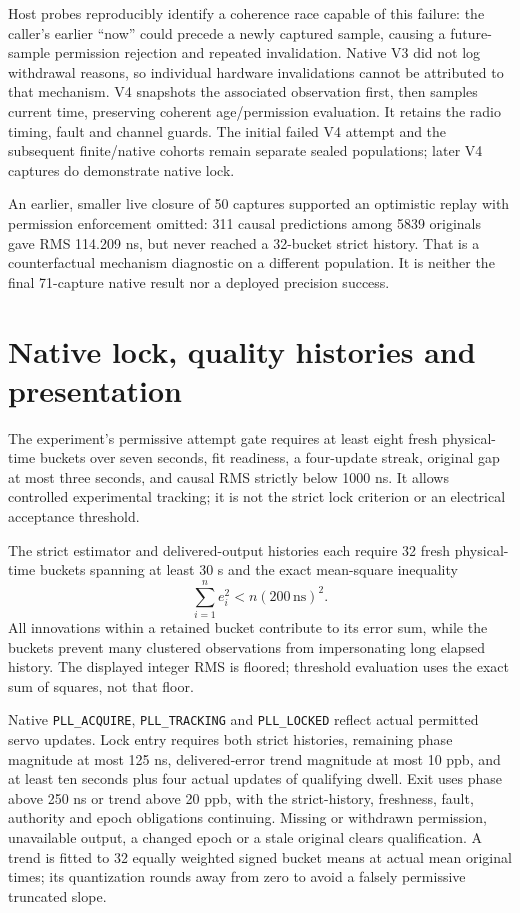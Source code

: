 \documentclass[11pt,letterpaper]{article}
\newcommand{\ns}{\,\mathrm{ns}}
\newcommand{\code}[1]{\texttt{\small #1}}
\begin{document}
Host probes reproducibly identify a coherence race capable of this failure: the caller's earlier ``now'' could precede a newly captured sample, causing a future-sample permission rejection and repeated invalidation. Native V3 did not log withdrawal reasons, so individual hardware invalidations cannot be attributed to that mechanism. V4 snapshots the associated observation first, then samples current time, preserving coherent age/permission evaluation. It retains the radio timing, fault and channel guards. The initial failed V4 attempt and the subsequent finite/native cohorts remain separate sealed populations; later V4 captures do demonstrate native lock.

An earlier, smaller live closure of 50 captures supported an optimistic replay with permission enforcement omitted: 311 causal predictions among 5839 originals gave RMS 114.209 ns, but never reached a 32-bucket strict history. That is a counterfactual mechanism diagnostic on a different population. It is neither the final 71-capture native result nor a deployed precision success.

\section{Native lock, quality histories and presentation}
The experiment's permissive attempt gate requires at least eight fresh physical-time buckets over seven seconds, fit readiness, a four-update streak, original gap at most three seconds, and causal RMS strictly below 1000 ns. It allows controlled experimental tracking; it is not the strict lock criterion or an electrical acceptance threshold.

The strict estimator and delivered-output histories each require 32 fresh physical-time buckets spanning at least 30 s and the exact mean-square inequality
\begin{equation}
 \sum_{i=1}^{n} e_i^2 < n(200\ns)^2 .\label{eq:gate}
\end{equation}
All innovations within a retained bucket contribute to its error sum, while the buckets prevent many clustered observations from impersonating long elapsed history. The displayed integer RMS is floored; threshold evaluation uses the exact sum of squares, not that floor.

Native \code{PLL\_ACQUIRE}, \code{PLL\_TRACKING} and \code{PLL\_LOCKED} reflect actual permitted servo updates. Lock entry requires both strict histories, remaining phase magnitude at most 125 ns, delivered-error trend magnitude at most 10 ppb, and at least ten seconds plus four actual updates of qualifying dwell. Exit uses phase above 250 ns or trend above 20 ppb, with the strict-history, freshness, fault, authority and epoch obligations continuing. Missing or withdrawn permission, unavailable output, a changed epoch or a stale original clears qualification. A trend is fitted to 32 equally weighted signed bucket means at actual mean original times; its quantization rounds away from zero to avoid a falsely permissive truncated slope.
\end{document}
